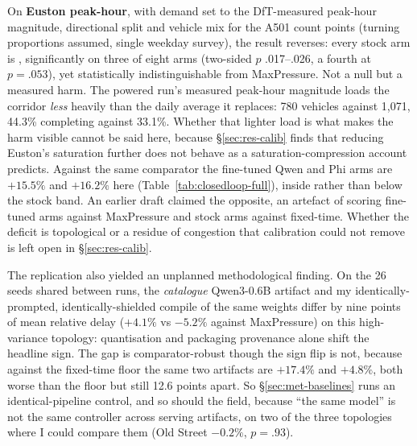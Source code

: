 On \textbf{Euston peak-hour}, with demand set to the DfT-measured
peak-hour magnitude, directional split and vehicle mix for the A501 count
points (turning proportions assumed, single weekday survey), the result
reverses: every stock arm
is ,
significantly on three of eight arms (two-sided $p$ .017--.026, a fourth
at $p{=}.053$), yet statistically indistinguishable from MaxPressure. Not
a null but a measured harm.
The powered run's measured peak-hour magnitude loads the corridor
\emph{less} heavily than the daily average it replaces: 780
vehicles against 1{,}071, 44.3\% completing against 33.1\%. Whether that
lighter load is what makes the harm visible cannot be said here, because
\S\ref{sec:res-calib} finds that reducing Euston's saturation further does
not behave as a saturation-compression account predicts.
 Against the same comparator the
fine-tuned Qwen and Phi arms are $+15.5\%$ and $+16.2\%$ here
(Table~\ref{tab:closedloop-full}), inside rather than below the stock
band. An earlier draft claimed the opposite, an artefact of scoring
fine-tuned arms against MaxPressure and stock arms against fixed-time.
Whether the deficit is topological or a residue of
congestion that calibration could not remove is left open in
\S\ref{sec:res-calib}.

The replication also yielded an unplanned methodological finding. On the
26 seeds shared between runs, the \emph{catalogue} Qwen3-0.6B artifact and
my identically-prompted, identically-shielded compile of the same weights
differ by nine points of mean relative delay ($+4.1\%$ vs $-5.2\%$ against
MaxPressure) on this high-variance topology: quantisation and packaging
provenance alone shift the headline sign. The gap is comparator-robust
though the sign flip is not, because against the fixed-time floor the
same two artifacts are $+17.4\%$ and $+4.8\%$, both worse than the floor
but still 12.6 points apart. So \S\ref{sec:met-baselines} runs an
identical-pipeline control, and so should the field, because ``the same
model'' is not the same controller across serving artifacts, on two of the
three topologies where I could compare them (Old Street $-0.2\%$,
$p{=}.93$).

